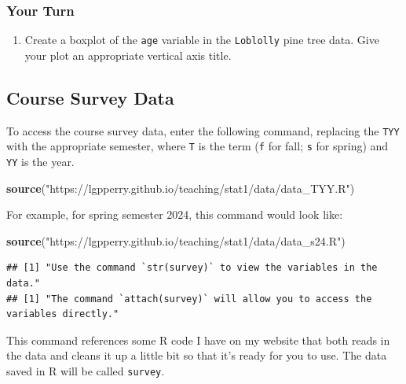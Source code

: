\documentclass[
]{book}
\newenvironment{Shaded}{\begin{snugshade}}{\end{snugshade}}
\newcommand{\FunctionTok}[1]{\textcolor[rgb]{0.13,0.29,0.53}{\textbf{#1}}}
\newcommand{\NormalTok}[1]{#1}
\newcommand{\StringTok}[1]{\textcolor[rgb]{0.31,0.60,0.02}{#1}}
\providecommand{\tightlist}{%
  \setlength{\itemsep}{0pt}\setlength{\parskip}{0pt}}
\begin{document}
\subsubsection*{Your Turn}\label{your-turn-9}

\begin{enumerate}
\def\labelenumi{\arabic{enumi}.}
\setcounter{enumi}{5}
\tightlist
\item
  Create a boxplot of the \texttt{age} variable in the \texttt{Loblolly} pine tree data. Give your plot an appropriate vertical axis title.
\end{enumerate}

\subsection*{Course Survey Data}\label{course-survey-data}

To access the course survey data, enter the following command, replacing the \texttt{TYY} with the appropriate semester, where \texttt{T} is the term (\texttt{f} for fall; \texttt{s} for spring) and \texttt{YY} is the year.

\begin{Shaded}
\begin{Highlighting}[]
\FunctionTok{source}\NormalTok{(}\StringTok{"https://lgpperry.github.io/teaching/stat1/data/data\_TYY.R"}\NormalTok{)}
\end{Highlighting}
\end{Shaded}

For example, for spring semester 2024, this command would look like:

\begin{Shaded}
\begin{Highlighting}[]
\FunctionTok{source}\NormalTok{(}\StringTok{"https://lgpperry.github.io/teaching/stat1/data/data\_s24.R"}\NormalTok{)}
\end{Highlighting}
\end{Shaded}

\begin{verbatim}
## [1] "Use the command `str(survey)` to view the variables in the data."
## [1] "The command `attach(survey)` will allow you to access the variables directly."
\end{verbatim}

This command references some R code I have on my website that both reads in the data and cleans it up a little bit so that it's ready for you to use. The data saved in R will be called \texttt{survey}.
\end{document}
